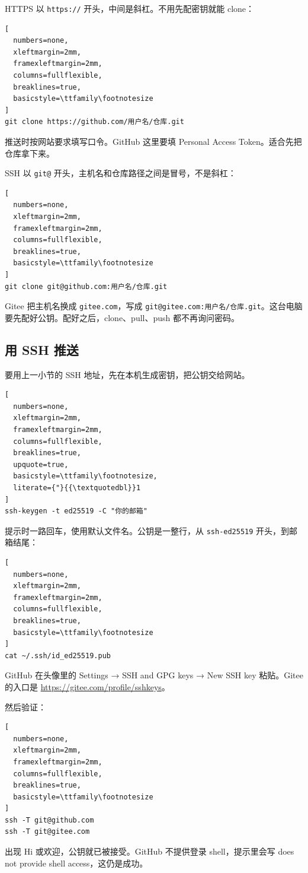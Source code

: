 HTTPS 以 \verb|https://| 开头，中间是斜杠。不用先配密钥就能 clone：
\begin{lstlisting}[
  numbers=none,
  xleftmargin=2mm,
  framexleftmargin=2mm,
  columns=fullflexible,
  breaklines=true,
  basicstyle=\ttfamily\footnotesize
]
git clone https://github.com/用户名/仓库.git
\end{lstlisting}
推送时按网站要求填写口令。GitHub 这里要填 Personal Access Token。适合先把仓库拿下来。

SSH 以 \verb|git@| 开头，主机名和仓库路径之间是冒号，不是斜杠：
\begin{lstlisting}[
  numbers=none,
  xleftmargin=2mm,
  framexleftmargin=2mm,
  columns=fullflexible,
  breaklines=true,
  basicstyle=\ttfamily\footnotesize
]
git clone git@github.com:用户名/仓库.git
\end{lstlisting}
Gitee 把主机名换成 \verb|gitee.com|，写成 \verb|git@gitee.com:用户名/仓库.git|。这台电脑要先配好公钥。配好之后，clone、pull、push 都不再询问密码。

\subsection{用 SSH 推送}
要用上一小节的 SSH 地址，先在本机生成密钥，把公钥交给网站。

\begin{lstlisting}[
  numbers=none,
  xleftmargin=2mm,
  framexleftmargin=2mm,
  columns=fullflexible,
  breaklines=true,
  upquote=true,
  basicstyle=\ttfamily\footnotesize,
  literate={"}{{\textquotedbl}}1
]
ssh-keygen -t ed25519 -C "你的邮箱"
\end{lstlisting}
提示时一路回车，使用默认文件名。公钥是一整行，从 \verb|ssh-ed25519| 开头，到邮箱结尾：
\begin{lstlisting}[
  numbers=none,
  xleftmargin=2mm,
  framexleftmargin=2mm,
  columns=fullflexible,
  breaklines=true,
  basicstyle=\ttfamily\footnotesize
]
cat ~/.ssh/id_ed25519.pub
\end{lstlisting}

GitHub 在头像里的 Settings → SSH and GPG keys → New SSH key 粘贴。Gitee 的入口是 \url{https://gitee.com/profile/sshkeys}。

然后验证：
\begin{lstlisting}[
  numbers=none,
  xleftmargin=2mm,
  framexleftmargin=2mm,
  columns=fullflexible,
  breaklines=true,
  basicstyle=\ttfamily\footnotesize
]
ssh -T git@github.com
ssh -T git@gitee.com
\end{lstlisting}
出现 Hi 或欢迎，公钥就已被接受。GitHub 不提供登录 shell，提示里会写 does not provide shell access，这仍是成功。

